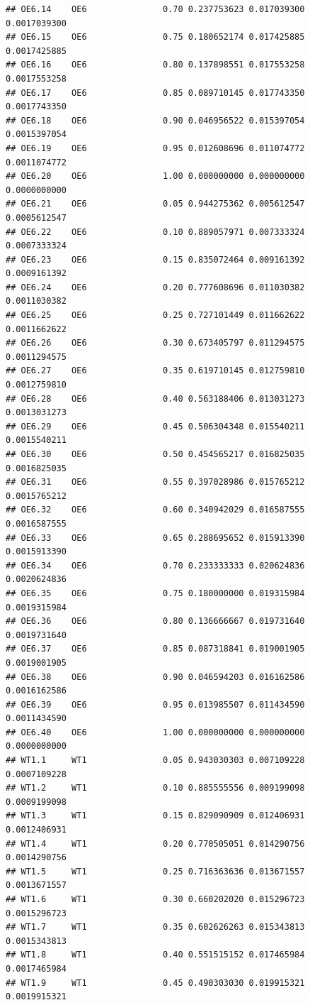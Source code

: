 \documentclass[
]{book}
\begin{document}
\begin{verbatim}
## OE6.14    OE6               0.70 0.237753623 0.017039300 0.0017039300
## OE6.15    OE6               0.75 0.180652174 0.017425885 0.0017425885
## OE6.16    OE6               0.80 0.137898551 0.017553258 0.0017553258
## OE6.17    OE6               0.85 0.089710145 0.017743350 0.0017743350
## OE6.18    OE6               0.90 0.046956522 0.015397054 0.0015397054
## OE6.19    OE6               0.95 0.012608696 0.011074772 0.0011074772
## OE6.20    OE6               1.00 0.000000000 0.000000000 0.0000000000
## OE6.21    OE6               0.05 0.944275362 0.005612547 0.0005612547
## OE6.22    OE6               0.10 0.889057971 0.007333324 0.0007333324
## OE6.23    OE6               0.15 0.835072464 0.009161392 0.0009161392
## OE6.24    OE6               0.20 0.777608696 0.011030382 0.0011030382
## OE6.25    OE6               0.25 0.727101449 0.011662622 0.0011662622
## OE6.26    OE6               0.30 0.673405797 0.011294575 0.0011294575
## OE6.27    OE6               0.35 0.619710145 0.012759810 0.0012759810
## OE6.28    OE6               0.40 0.563188406 0.013031273 0.0013031273
## OE6.29    OE6               0.45 0.506304348 0.015540211 0.0015540211
## OE6.30    OE6               0.50 0.454565217 0.016825035 0.0016825035
## OE6.31    OE6               0.55 0.397028986 0.015765212 0.0015765212
## OE6.32    OE6               0.60 0.340942029 0.016587555 0.0016587555
## OE6.33    OE6               0.65 0.288695652 0.015913390 0.0015913390
## OE6.34    OE6               0.70 0.233333333 0.020624836 0.0020624836
## OE6.35    OE6               0.75 0.180000000 0.019315984 0.0019315984
## OE6.36    OE6               0.80 0.136666667 0.019731640 0.0019731640
## OE6.37    OE6               0.85 0.087318841 0.019001905 0.0019001905
## OE6.38    OE6               0.90 0.046594203 0.016162586 0.0016162586
## OE6.39    OE6               0.95 0.013985507 0.011434590 0.0011434590
## OE6.40    OE6               1.00 0.000000000 0.000000000 0.0000000000
## WT1.1     WT1               0.05 0.943030303 0.007109228 0.0007109228
## WT1.2     WT1               0.10 0.885555556 0.009199098 0.0009199098
## WT1.3     WT1               0.15 0.829090909 0.012406931 0.0012406931
## WT1.4     WT1               0.20 0.770505051 0.014290756 0.0014290756
## WT1.5     WT1               0.25 0.716363636 0.013671557 0.0013671557
## WT1.6     WT1               0.30 0.660202020 0.015296723 0.0015296723
## WT1.7     WT1               0.35 0.602626263 0.015343813 0.0015343813
## WT1.8     WT1               0.40 0.551515152 0.017465984 0.0017465984
## WT1.9     WT1               0.45 0.490303030 0.019915321 0.0019915321

\end{verbatim}
\end{document}
